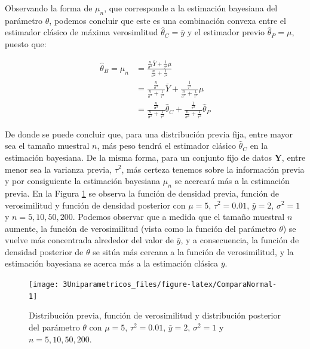 \documentclass[
  10pt,
  spanish,
]{book}
\theoremstyle{definition}
\theoremstyle{definition}
\theoremstyle{definition}
\theoremstyle{definition}
\theoremstyle{remark}
\begin{document}
Observando la forma de \(\mu_n\), que corresponde a la estimación bayesiana del parámetro \(\theta\), podemos concluir que este es una combinación convexa entre el estimador clásico de máxima verosimlitud \(\hat{\theta}_C=\bar{y}\) y el estimador previo \(\hat{\theta}_P=\mu\), puesto que:

\begin{align*}
\hat{\theta}_B=\mu_n&=\frac{\frac{n}{\sigma^2}\bar{Y}+\frac{1}{\tau^2}\mu}{\frac{n}{\sigma^2}+\frac{1}{\tau^2}}\\
&=\frac{\frac{n}{\sigma^2}}{\frac{n}{\sigma^2}+\frac{1}{\tau^2}}\bar{Y}+\frac{\frac{1}{\tau^2}}{\frac{n}{\sigma^2}+\frac{1}{\tau^2}}\mu\\
&=\frac{\frac{n}{\sigma^2}}{\frac{n}{\sigma^2}+\frac{1}{\tau^2}}\hat{\theta}_C+\frac{\frac{1}{\tau^2}}{\frac{n}{\sigma^2}+\frac{1}{\tau^2}}\hat{\theta}_P
\end{align*}

De donde se puede concluir que, para una distribución previa fija, entre mayor sea el tamaño muestral \(n\), más peso tendrá el estimador clásico \(\hat{\theta}_C\) en la estimación bayesiana. De la misma forma, para un conjunto fijo de datos \(\mathbf{Y}\), entre menor sea la varianza previa, \(\tau^2\), más certeza tenemos sobre la información previa y por consiguiente la estimación bayesiana \(\mu_n\) se acercará más a la estimación previa. En la Figura \ref{fig:ComparaNormal} se observa la función de densidad previa, función de verosimilitud y función de densidad posterior con \(\mu=5\), \(\tau^2=0.01\), \(\bar{y}=2\), \(\sigma^2=1\) y \(n=5,10,50,200\). Podemos observar que a medida que el tamaño muestral \(n\) aumente, la función de verosimilitud (vista como la función del parámetro \(\theta\)) se vuelve más concentrada alrededor del valor de \(\bar{y}\), y a consecuencia, la función de densidad posterior de \(\theta\) se sitúa más cercana a la función de verosimilitud, y la estimación bayesiana se acerca más a la estimación clásica \(\bar{y}\).

\begin{figure}

{\centering \texttt{[image: 3Uniparametricos\_files/figure-latex/ComparaNormal-1]} 

}

\caption{Distribución previa, función de verosimilitud y distribución posterior del parámetro $\theta$ con $\mu=5$, $\tau^2=0.01$, $\bar{y}=2$, $\sigma^2=1$ y $n=5,10,50,200$.}\label{fig:ComparaNormal}
\end{figure}
\end{document}
